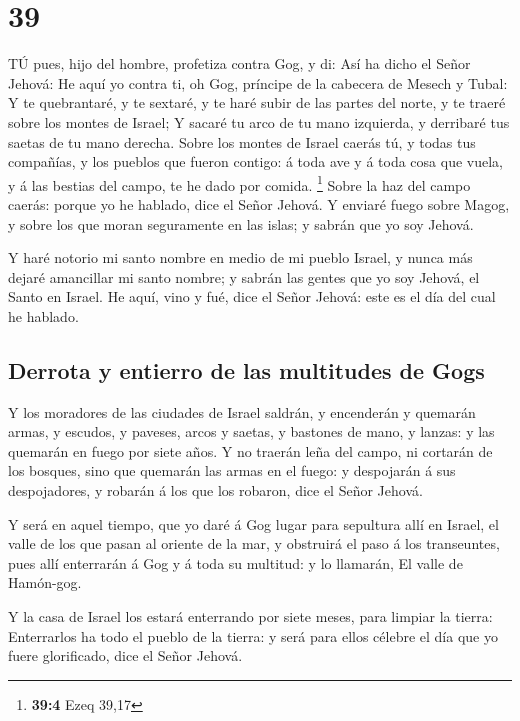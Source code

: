 \hypertarget{section-38}{%
\section{39}\label{section-38}}

 TÚ pues, hijo del hombre, profetiza contra Gog, y di: Así
ha dicho el Señor Jehová: He aquí yo contra ti, oh Gog, príncipe de la
cabecera de Mesech y Tubal:  Y te quebrantaré, y te sextaré,
y te haré subir de las partes del norte, y te traeré sobre los montes de
Israel;  Y sacaré tu arco de tu mano izquierda, y derribaré
tus saetas de tu mano derecha.  Sobre los montes de Israel
caerás tú, y todas tus compañías, y los pueblos que fueron contigo: á
toda ave y á toda cosa que vuela, y á las bestias del campo, te he dado
por comida. \footnote{\textbf{39:4} Ezeq 39,17}  Sobre la
haz del campo caerás: porque yo he hablado, dice el Señor Jehová.
 Y enviaré fuego sobre Magog, y sobre los que moran
seguramente en las islas; y sabrán que yo soy Jehová.

 Y haré notorio mi santo nombre en medio de mi pueblo
Israel, y nunca más dejaré amancillar mi santo nombre; y sabrán las
gentes que yo soy Jehová, el Santo en Israel.  He aquí, vino
y fué, dice el Señor Jehová: este es el día del cual he hablado.

\hypertarget{derrota-y-entierro-de-las-multitudes-de-gogs}{%
\subsection{Derrota y entierro de las multitudes de
Gogs}\label{derrota-y-entierro-de-las-multitudes-de-gogs}}

 Y los moradores de las ciudades de Israel saldrán, y
encenderán y quemarán armas, y escudos, y paveses, arcos y saetas, y
bastones de mano, y lanzas: y las quemarán en fuego por siete años.
 Y no traerán leña del campo, ni cortarán de los bosques,
sino que quemarán las armas en el fuego: y despojarán á sus
despojadores, y robarán á los que los robaron, dice el Señor Jehová.

 Y será en aquel tiempo, que yo daré á Gog lugar para
sepultura allí en Israel, el valle de los que pasan al oriente de la
mar, y obstruirá el paso á los transeuntes, pues allí enterrarán á Gog y
á toda su multitud: y lo llamarán, El valle de Hamón-gog.

 Y la casa de Israel los estará enterrando por siete meses,
para limpiar la tierra:  Enterrarlos ha todo el pueblo de
la tierra: y será para ellos célebre el día que yo fuere glorificado,
dice el Señor Jehová.


